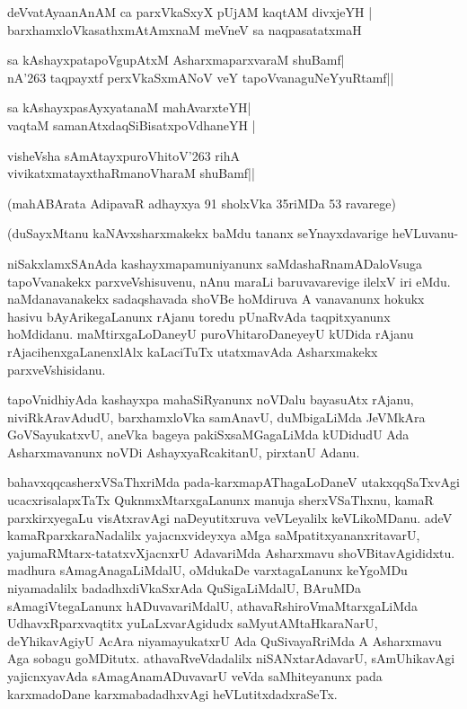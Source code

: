 \begin{shloka}
deVvatAyaanAnAM ca parxVkaSxyX pUjAM kaqtAM divxjeYH |\\
barxhamxloVkasathxmAtAmxnaM meVneV sa naqpasatatxmaH
\end{shloka}

\begin{shloka}
sa kAshayxpatapoVgupAtxM AsharxmaparxvaraM shuBamf|\\
nA\char'263 taqpayxtf perxVkaSxmANoV veY tapoVvanaguNeYyuRtamf||
\end{shloka}

\begin{shloka}
sa kAshayxpasAyxyatanaM mahAvarxteYH|\\
vaqtaM samanAtxdaqSiBisatxpoVdhaneYH |
\end{shloka}

\begin{shloka}
visheVsha sAmAtayxpuroVhitoV\char'263 rihA\\
vivikatxmatayxthaRmanoVharaM shuBamf||
\end{shloka}

(mahABArata AdipavaR adhayxya 91 sholxVka 35riMDa 53 ravarege)

(duSayxMtanu kaNAvxsharxmakekx baMdu tananx seYnayxdavarige heVLuvanu-

niSakxlamxSAnAda kashayxmapamuniyanunx saMdashaRnamADaloVsuga tapoVvanakekx parxveVshisuvenu, nAnu maraLi baruvavarevige ilelxV iri eMdu. naMdanavanakekx sadaqshavada shoVBe hoMdiruva A vanavanunx hokukx hasivu bAyArikegaLanunx rAjanu toredu pUnaRvAda taqpitxyanunx hoMdidanu. maMtirxgaLoDaneyU puroVhitaroDaneyeyU kUDida rAjanu rAjacihenxgaLanenxlAlx kaLaciTuTx utatxmavAda Asharxmakekx parxveVshisidanu.

tapoVnidhiyAda kashayxpa mahaSiRyanunx noVDalu bayasuAtx rAjanu, niviRkAravAdudU, barxhamxloVka samAnavU, duMbigaLiMda JeVMkAra GoVSayukatxvU, aneVka bageya pakiSxsaMGagaLiMda kUDidudU Ada Asharxmavanunx noVDi AshayxyaRcakitanU, pirxtanU Adanu.

bahavxqqcasherxVSaThxriMda pada-karxmapAThagaLoDaneV utakxqqSaTxvAgi ucacxrisalapxTaTx QuknmxMtarxgaLanunx manuja sherxVSaThxnu, kamaR parxkirxyegaLu visAtxravAgi naDeyutitxruva veVLeyalilx keVLikoMDanu. adeV kamaRparxkaraNadalilx yajacnxvideyxya aMga saMpatitxyananxritavarU, yajumaRMtarx-tatatxvXjacnxrU AdavariMda Asharxmavu shoVBitavAgididxtu. madhura sAmagAnagaLiMdalU, oMdukaDe varxtagaLanunx keYgoMDu niyamadalilx badadhxdiVkaSxrAda QuSigaLiMdalU, BAruMDa sAmagiVtegaLanunx hADuvavariMdalU, athavaRshiroVmaMtarxgaLiMda UdhavxRparxvaqtitx yuLaLxvarAgidudx saMyutAMtaHkaraNarU, deYhikavAgiyU AcAra niyamayukatxrU Ada QuSivayaRriMda A Asharxmavu Aga sobagu goMDitutx. athavaRveVdadalilx niSANxtarAdavarU, sAmUhikavAgi yajicnxyavAda sAmagAnamADuvavarU veVda saMhiteyanunx pada karxmadoDane karxmabadadhxvAgi heVLutitxdadxraSeTx.

